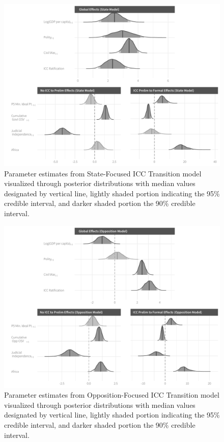 \begin{figure}
    \centering
    \includegraphics[width=1\textwidth]{stateCoefSumm.pdf}
    \caption{Parameter estimates from State-Focused ICC Transition model visualized through posterior distributions with median values designated by vertical line, lightly shaded portion indicating the 95\% credible interval, and darker shaded portion the 90\% credible interval.}
    \label{fig:stateModel}
\end{figure}

\begin{figure}
    \centering
    \includegraphics[width=1\textwidth]{rebelCoefSumm.pdf}
    \caption{Parameter estimates from Opposition-Focused ICC Transition model visualized through posterior distributions with median values designated by vertical line, lightly shaded portion indicating the 95\% credible interval, and darker shaded portion the 90\% credible interval.}
    \label{fig:rebelModel}
\end{figure}

